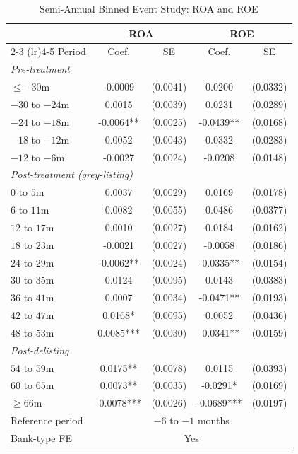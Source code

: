 \begin{table}[H]
\centering
\caption{Semi-Annual Binned Event Study: ROA and ROE}
\label{tab:eventstudy}
\begin{threeparttable}
\begin{tabular}{lcccc}
\toprule
 & \multicolumn{2}{c}{ROA} & \multicolumn{2}{c}{ROE} \\
\cmidrule(lr){2-3} \cmidrule(lr){4-5}
Period & Coef. & SE & Coef. & SE \\
\midrule
\multicolumn{5}{l}{\textit{Pre-treatment}} \\
$\leq -30$m & -0.0009 & (0.0041) & 0.0200 & (0.0332) \\
$-30$ to $-24$m & 0.0015 & (0.0039) & 0.0231 & (0.0289) \\
$-24$ to $-18$m & -0.0064** & (0.0025) & -0.0439** & (0.0168) \\
$-18$ to $-12$m & 0.0052 & (0.0043) & 0.0332 & (0.0283) \\
$-12$ to $-6$m & -0.0027 & (0.0024) & -0.0208 & (0.0148) \\
\midrule
\multicolumn{5}{l}{\textit{Post-treatment (grey-listing)}} \\
$0$ to $5$m & 0.0037 & (0.0029) & 0.0169 & (0.0178) \\
$6$ to $11$m & 0.0082 & (0.0055) & 0.0486 & (0.0377) \\
$12$ to $17$m & 0.0010 & (0.0027) & 0.0184 & (0.0162) \\
$18$ to $23$m & -0.0021 & (0.0027) & -0.0058 & (0.0186) \\
$24$ to $29$m & -0.0062** & (0.0024) & -0.0335** & (0.0154) \\
$30$ to $35$m & 0.0124 & (0.0095) & 0.0143 & (0.0383) \\
$36$ to $41$m & 0.0007 & (0.0034) & -0.0471** & (0.0193) \\
$42$ to $47$m & 0.0168* & (0.0095) & 0.0052 & (0.0436) \\
$48$ to $53$m & 0.0085*** & (0.0030) & -0.0341** & (0.0159) \\
\midrule
\multicolumn{5}{l}{\textit{Post-delisting}} \\
$54$ to $59$m & 0.0175** & (0.0078) & 0.0115 & (0.0393) \\
$60$ to $65$m & 0.0073** & (0.0035) & -0.0291* & (0.0169) \\
$\geq 66$m & -0.0078*** & (0.0026) & -0.0689*** & (0.0197) \\
\midrule
Reference period & \multicolumn{4}{c}{$-6$ to $-1$ months} \\
Bank-type FE & \multicolumn{4}{c}{Yes} \\

\end{tabular}
\end{threeparttable}
\end{table}
